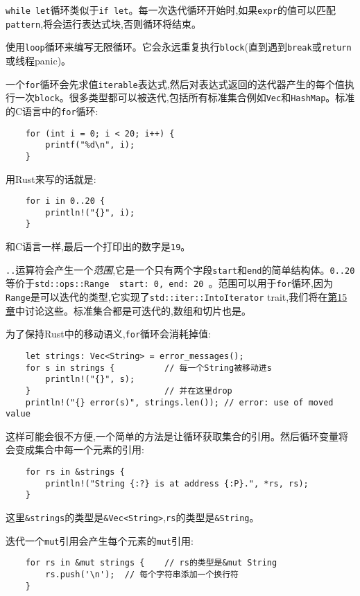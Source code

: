 \texttt{while let}循环类似于\texttt{if let}。每一次迭代循环开始时,如果\texttt{expr}的值可以匹配\texttt{pattern},将会运行表达式块,否则循环将结束。

使用\texttt{loop}循环来编写无限循环。它会永远重复执行\texttt{block}(直到遇到\texttt{break}或\texttt{return}或线程panic)。

一个\texttt{for}循环会先求值\texttt{iterable}表达式,然后对表达式返回的迭代器产生的每个值执行一次\texttt{block}。很多类型都可以被迭代,包括所有标准集合例如\texttt{Vec}和\texttt{HashMap}。标准的C语言中的\texttt{for}循环:
\begin{verbatim}
    for (int i = 0; i < 20; i++) {
        printf("%d\n", i);
    }
\end{verbatim}
用Rust来写的话就是:
\begin{verbatim}
    for i in 0..20 {
        println!("{}", i);
    }
\end{verbatim}
和C语言一样,最后一个打印出的数字是\texttt{19}。

\texttt{..}运算符会产生一个\emph{范围},它是一个只有两个字段\texttt{start}和\texttt{end}的简单结构体。\texttt{0..20}等价于\texttt{std::ops::Range { start: 0, end: 20 }}。范围可以用于\texttt{for}循环,因为\texttt{Range}是可以迭代的类型,它实现了\texttt{std::iter::IntoIterator} trait,我们将在\hyperref[ch15]{第15章}中讨论这些。标准集合都是可迭代的,数组和切片也是。

为了保持Rust中的移动语义,\texttt{for}循环会消耗掉值:
\begin{verbatim}
    let strings: Vec<String> = error_messages();
    for s in strings {          // 每一个String被移动进s
        println!("{}", s);
    }                           // 并在这里drop
    println!("{} error(s)", strings.len()); // error: use of moved value
\end{verbatim}

这样可能会很不方便,一个简单的方法是让循环获取集合的引用。然后循环变量将会变成集合中每一个元素的引用:
\begin{verbatim}
    for rs in &strings {
        println!("String {:?} is at address {:P}.", *rs, rs);
    }
\end{verbatim}

这里\texttt{\&strings}的类型是\texttt{\&Vec<String>},\texttt{rs}的类型是\texttt{\&String}。

迭代一个\texttt{mut}引用会产生每个元素的\texttt{mut}引用:
\begin{verbatim}
    for rs in &mut strings {    // rs的类型是&mut String
        rs.push('\n');  // 每个字符串添加一个换行符
    }
\end{verbatim}

